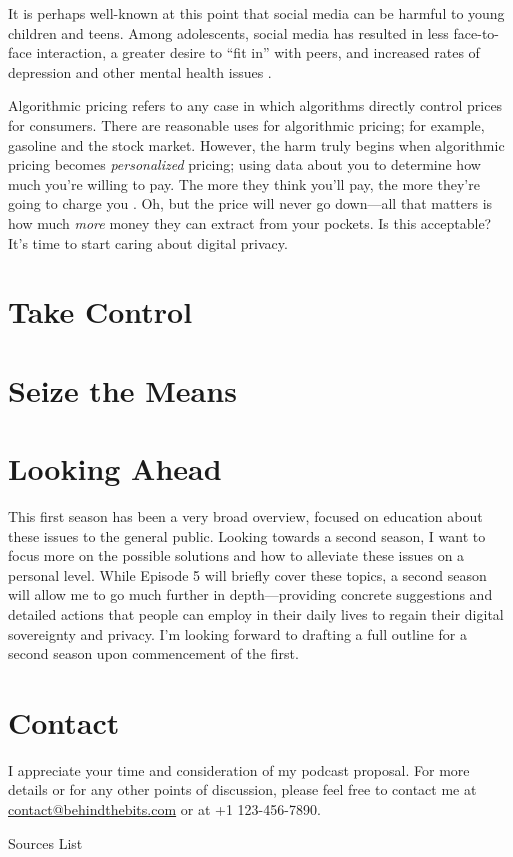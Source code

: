 \documentclass[12pt]{article}
\begin{document}
It is perhaps well-known at this point that social media can be harmful to young
children and teens. Among adolescents, social media has resulted in less
face-to-face interaction, a greater desire to ``fit in'' with peers, and
increased rates of depression and other mental health issues \autocite{Allen2019:Social}.

Algorithmic pricing refers to any case in which algorithms directly control
prices for consumers. There are reasonable uses for algorithmic pricing; for
example, gasoline and the stock market. However, the harm truly begins when
algorithmic pricing becomes \emph{personalized} pricing; using data about you to
determine how much you're willing to pay. The more they think you'll pay, the
more they're going to charge you \autocite{Bar-Gill2019:Symposium}. Oh, but the
price will never go down---all that matters is how much \emph{more} money they
can extract from your pockets. Is this acceptable? It's time to start caring
about digital privacy.

\section{Take Control}

\section{Seize the Means}


\section*{Looking Ahead}
This first season has been a very broad overview, focused on education about
these issues to the general public. Looking towards a second season, I want to
focus more on the possible solutions and how to alleviate these issues on a
personal level. While Episode 5 will briefly cover these topics, a second season
will allow me to go much further in depth---providing concrete suggestions and
detailed actions that people can employ in their daily lives to regain their
digital sovereignty and privacy. I'm looking forward to drafting a full outline
for a second season upon commencement of the first.

\section*{Contact}
I appreciate your time and consideration of my podcast proposal. For more
details or for any other points of discussion, please feel free to contact me at
\href{mailto:contact@behindthebits.com}{contact@behindthebits.com} or at +1 123-456-7890.

\clearpage
\begin{center}
  Sources List
\end{center}
\printbibliography[title={\relax}]
\end{document}
